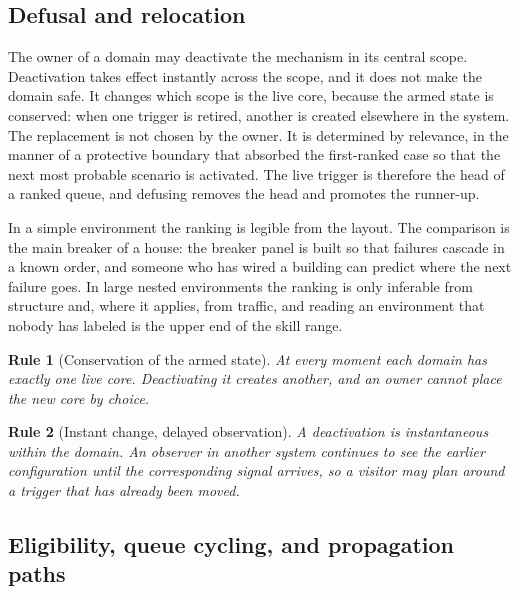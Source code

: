 \documentclass[11pt]{article}
\newtheorem{designrule}{Rule}
\begin{document}
\subsection{Defusal and relocation}

The owner of a domain may deactivate the mechanism in its central scope. Deactivation takes effect instantly across the scope, and it does not make the domain safe. It changes which scope is the live core, because the armed state is conserved: when one trigger is retired, another is created elsewhere in the system. The replacement is not chosen by the owner. It is determined by relevance, in the manner of a protective boundary that absorbed the first-ranked case so that the next most probable scenario is activated. The live trigger is therefore the head of a ranked queue, and defusing removes the head and promotes the runner-up.

In a simple environment the ranking is legible from the layout. The comparison is the main breaker of a house: the breaker panel is built so that failures cascade in a known order, and someone who has wired a building can predict where the next failure goes. In large nested environments the ranking is only inferable from structure and, where it applies, from traffic, and reading an environment that nobody has labeled is the upper end of the skill range.

\begin{designrule}[Conservation of the armed state]
At every moment each domain has exactly one live core. Deactivating it creates another, and an owner cannot place the new core by choice.
\end{designrule}

\begin{designrule}[Instant change, delayed observation]
A deactivation is instantaneous within the domain. An observer in another system continues to see the earlier configuration until the corresponding signal arrives, so a visitor may plan around a trigger that has already been moved.
\end{designrule}

\subsection{Eligibility, queue cycling, and propagation paths}
\end{document}
